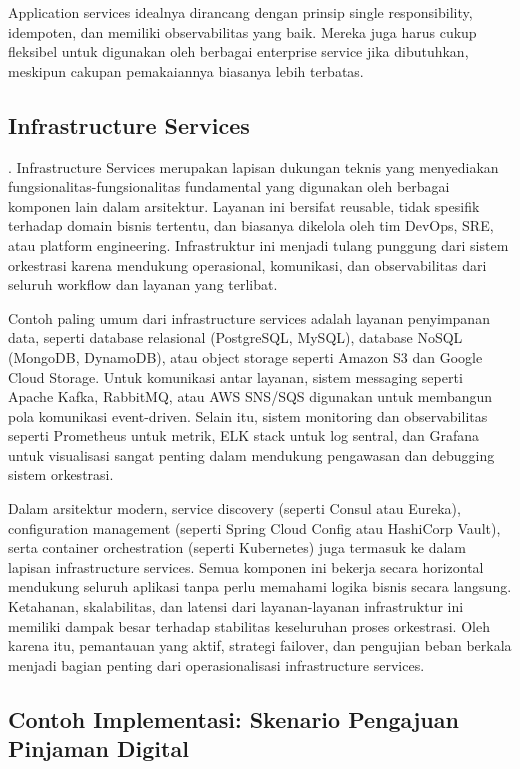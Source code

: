Application services idealnya dirancang dengan prinsip single responsibility, idempoten, dan memiliki observabilitas yang baik. Mereka juga harus cukup fleksibel untuk digunakan oleh berbagai enterprise service jika dibutuhkan, meskipun cakupan pemakaiannya biasanya lebih terbatas.


\subsection{Infrastructure Services}. 
Infrastructure Services merupakan lapisan dukungan teknis yang menyediakan fungsionalitas-fungsionalitas fundamental yang digunakan oleh berbagai komponen lain dalam arsitektur. Layanan ini bersifat reusable, tidak spesifik terhadap domain bisnis tertentu, dan biasanya dikelola oleh tim DevOps, SRE, atau platform engineering. Infrastruktur ini menjadi tulang punggung dari sistem orkestrasi karena mendukung operasional, komunikasi, dan observabilitas dari seluruh workflow dan layanan yang terlibat.

Contoh paling umum dari infrastructure services adalah layanan penyimpanan data, seperti database relasional (PostgreSQL, MySQL), database NoSQL (MongoDB, DynamoDB), atau object storage seperti Amazon S3 dan Google Cloud Storage. Untuk komunikasi antar layanan, sistem messaging seperti Apache Kafka, RabbitMQ, atau AWS SNS/SQS digunakan untuk membangun pola komunikasi event-driven. Selain itu, sistem monitoring dan observabilitas seperti Prometheus untuk metrik, ELK stack untuk log sentral, dan Grafana untuk visualisasi sangat penting dalam mendukung pengawasan dan debugging sistem orkestrasi.

Dalam arsitektur modern, service discovery (seperti Consul atau Eureka), configuration management (seperti Spring Cloud Config atau HashiCorp Vault), serta container orchestration (seperti Kubernetes) juga termasuk ke dalam lapisan infrastructure services. Semua komponen ini bekerja secara horizontal mendukung seluruh aplikasi tanpa perlu memahami logika bisnis secara langsung. Ketahanan, skalabilitas, dan latensi dari layanan-layanan infrastruktur ini memiliki dampak besar terhadap stabilitas keseluruhan proses orkestrasi. Oleh karena itu, pemantauan yang aktif, strategi failover, dan pengujian beban berkala menjadi bagian penting dari operasionalisasi infrastructure services.


\subsection*{Contoh Implementasi: Skenario Pengajuan Pinjaman Digital}


